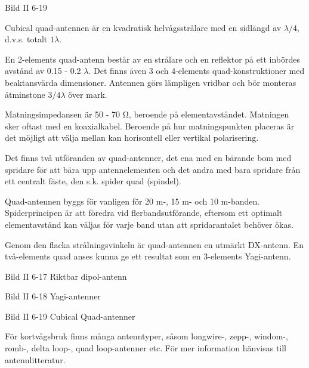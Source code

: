 Bild II 6-19

Cubical quad-antennen är en kvadratisk helvågsstrålare med en sidlängd
av \(\lambda/4\), d.v.s. totalt \(1\lambda\).

En 2-elements quad-antenn består av en strålare och en reflektor på
ett inbördes avstånd av 0.15 - 0.2 \(\lambda\). Det finns även 3 och
4-elements quad-konstruktioner med beaktansvärda dimensioner. Antennen
görs lämpligen vridbar och bör monteras åtminstone \(3/4 \lambda\)
över mark.

Matningsimpedansen är 50 - 70 Ω, beroende på elementavståndet.
Matningen sker oftast med en koaxialkabel. Beroende på hur
matningspunkten placeras är det möjligt att välja mellan kan
horisontell eller vertikal polarisering.

Det finns två utföranden av quad-antenner, det ena med en bärande bom
med spridare för att bära upp antennelementen och det andra med bara
spridare från ett centralt fäste, den s.k. spider quad (spindel).

Quad-antennen byggs för vanligen för 20 m-, 15 m- och 10
m-banden. Spiderprincipen är att föredra vid flerbandsutförande,
eftersom ett optimalt elementavstånd kan väljas för varje band utan
att spridarantalet behöver ökas.

Genom den flacka strålningsvinkeln är quad-antennen en utmärkt
DX-antenn. En två-elements quad anses kunna ge ett resultat som en
3-elements Yagi-antenn.

Bild II 6-17 Riktbar dipol-antenn

Bild II 6-18 Yagi-antenner

Bild II 6-19 Cubical Quad-antenner

För kortvågsbruk finns många antenntyper, såsom longwire-, zepp-,
windom-, romb-, delta loop-, quad loop-antenner etc. För mer
information hänvisas till antennlitteratur.
